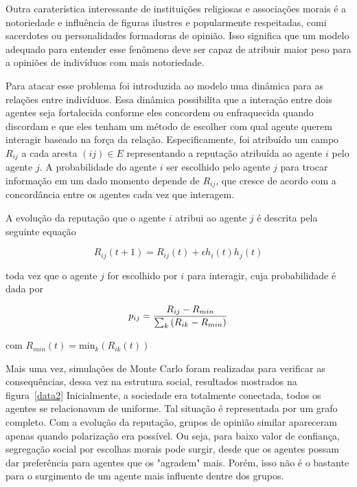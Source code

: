\documentclass[11pt]{article}
\begin{document}
Outra caraterística interessante de instituições religiosas e associações morais
é a notoriedade e influência de figuras ilustres e popularmente respeitadas,
comi sacerdotes ou personalidades formadoras de opinião. Isso significa que um
modelo adequado para entender esse fenômeno deve ser capaz de atribuir maior
peso para a opiniões de indivíduos com mais notoriedade.

Para atacar esse problema foi introduzida ao modelo uma dinâmica para as
relações entre indivíduos. Essa dinâmica possibilita que a interação entre dois
agentes seja fortalecida conforme eles concordem ou enfraquecida quando
discordam e que eles tenham um método de escolher com qual agente querem
interagir baseado na força da relação. Especificamente, foi atribuído um campo
$R_{ij}$ a cada aresta $(ij) \in E$ representando a reputação atribuída ao
agente $i$ pelo agente $j$. A probabilidade do agente $i$ ser escolhido pelo
agente $j$ para trocar informação em um dado momento depende de $R_{ij}$, que
cresce de acordo com a concordância entre os agentes cada vez que interagem.

A evolução da reputação que o agente $i$ atribui ao agente $j$ é descrita pela
seguinte equação

\[R_{ij}(t+1) = R_{ij}(t) + \epsilon h_i(t)h_j(t)\]

toda vez que o agente $j$ for escolhido por $i$ para interagir, cuja
probabilidade é dada por 

\[p_{ij} = \frac{R_{ij}-R_{min}}{\sum_k \displaystyle \left(R_{ik}-R_{min}\right)}\]

com $R_{min}(t)=\mathrm{min}_k(R_{ik}(t))$

Mais uma vez, simulações de Monte Carlo foram realizadas para verificar as
consequências, dessa vez na estrutura social, resultados mostrados na
figura~\ref{data2}
Inicialmente, a sociedade era totalmente conectada, todos os agentes se
relacionavam de uniforme. Tal situação é representada por um grafo completo. Com
a evolução da reputação, grupos de opinião similar apareceram apenas quando
polarização era possível. 
Ou seja, para baixo valor de confiança, segregação social por escolhas morais
pode surgir, desde que os agentes possam dar preferência para agentes que os
"agradem" mais. Porém, isso não é o bastante para o surgimento de um agente mais
influente dentre dos grupos.
\end{document}
